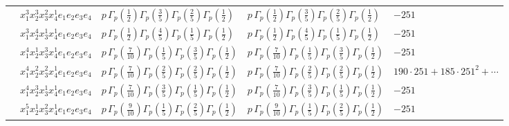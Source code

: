 \documentclass[11pt]{article}
\begin{document}
\begin{table}[ht]
{\begin{tabular}{@{}lllll@{}}
 & $x_{1}^{3} x_{2}^{3} x_{3}^{2} x_{4}^{1}  e_{1} e_{2} e_{3} e_{4}$ & $p \, \Gamma_p \left( \frac{1}{2} \right) \Gamma_p \left( \frac{3}{5} \right) \Gamma_p \left( \frac{2}{5} \right) \Gamma_p \left( \frac{1}{2} \right)$ & $p \, \Gamma_p \left( \frac{1}{2} \right) \Gamma_p \left( \frac{3}{5} \right) \Gamma_p \left( \frac{2}{5} \right) \Gamma_p \left( \frac{1}{2} \right)$ & $-251$ \\
 & $x_{1}^{3} x_{2}^{4} x_{3}^{1} x_{4}^{1}  e_{1} e_{2} e_{3} e_{4}$ & $p \, \Gamma_p \left( \frac{1}{2} \right) \Gamma_p \left( \frac{4}{5} \right) \Gamma_p \left( \frac{1}{5} \right) \Gamma_p \left( \frac{1}{2} \right)$ & $p \, \Gamma_p \left( \frac{1}{2} \right) \Gamma_p \left( \frac{4}{5} \right) \Gamma_p \left( \frac{1}{5} \right) \Gamma_p \left( \frac{1}{2} \right)$ & $-251$ \\
 & $x_{1}^{4} x_{2}^{1} x_{3}^{3} x_{4}^{1}  e_{1} e_{2} e_{3} e_{4}$ & $p \, \Gamma_p \left( \frac{7}{10} \right) \Gamma_p \left( \frac{1}{5} \right) \Gamma_p \left( \frac{3}{5} \right) \Gamma_p \left( \frac{1}{2} \right)$ & $p \, \Gamma_p \left( \frac{7}{10} \right) \Gamma_p \left( \frac{1}{5} \right) \Gamma_p \left( \frac{3}{5} \right) \Gamma_p \left( \frac{1}{2} \right)$ & $-251$ \\
 & $x_{1}^{4} x_{2}^{2} x_{3}^{2} x_{4}^{1}  e_{1} e_{2} e_{3} e_{4}$ & $p \, \Gamma_p \left( \frac{7}{10} \right) \Gamma_p \left( \frac{2}{5} \right) \Gamma_p \left( \frac{2}{5} \right) \Gamma_p \left( \frac{1}{2} \right)$ & $p \, \Gamma_p \left( \frac{7}{10} \right) \Gamma_p \left( \frac{2}{5} \right) \Gamma_p \left( \frac{2}{5} \right) \Gamma_p \left( \frac{1}{2} \right)$ & $190{\cdot}251{+}185{\cdot}251^{2}{+}\cdots$ \\
 & $x_{1}^{4} x_{2}^{3} x_{3}^{1} x_{4}^{1}  e_{1} e_{2} e_{3} e_{4}$ & $p \, \Gamma_p \left( \frac{7}{10} \right) \Gamma_p \left( \frac{3}{5} \right) \Gamma_p \left( \frac{1}{5} \right) \Gamma_p \left( \frac{1}{2} \right)$ & $p \, \Gamma_p \left( \frac{7}{10} \right) \Gamma_p \left( \frac{3}{5} \right) \Gamma_p \left( \frac{1}{5} \right) \Gamma_p \left( \frac{1}{2} \right)$ & $-251$ \\
 & $x_{1}^{5} x_{2}^{1} x_{3}^{2} x_{4}^{1}  e_{1} e_{2} e_{3} e_{4}$ & $p \, \Gamma_p \left( \frac{9}{10} \right) \Gamma_p \left( \frac{1}{5} \right) \Gamma_p \left( \frac{2}{5} \right) \Gamma_p \left( \frac{1}{2} \right)$ & $p \, \Gamma_p \left( \frac{9}{10} \right) \Gamma_p \left( \frac{1}{5} \right) \Gamma_p \left( \frac{2}{5} \right) \Gamma_p \left( \frac{1}{2} \right)$ & $-251$ \\

\end{tabular}}
\end{table}
\end{document}
